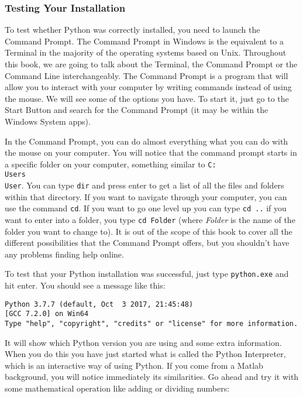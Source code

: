 \subsubsection{Testing Your Installation}
To test whether Python was correctly installed, you need to launch the Command Prompt. The Command Prompt in Windows is the equivalent to a Terminal in the majority of the operating systems based on Unix. Throughout this book, we are going to talk about the Terminal, the Command Prompt or the Command Line interchangeably. The Command Prompt is a program that will allow you to interact with your computer by writing commands instead of using the mouse. We will see some of the options you have. To start it, just go to the Start Button and search for the Command Prompt (it may be within the Windows System apps). 

In the Command Prompt, you can do almost everything what you can do with the mouse on your computer. You will notice that the command prompt starts in a specific folder on your computer, something similar to \texttt{C:\\Users\\User}. You can type \texttt{dir} and press enter to get a list of all the files and folders within that directory. If you want to navigate through your computer, you can use the command \texttt{cd}. If you want to go one level up you can type \texttt{cd ..} if you want to enter into a folder, you type \texttt{cd Folder} (where \textit{Folder} is the name of the folder you want to change to). It is out of the scope of this book to cover all the different possibilities that the Command Prompt offers, but you shouldn't have any problems finding help online.

To test that your Python installation was successful, just type \texttt{python.exe} and hit enter. You should see a message like this:

\begin{verbatim}
Python 3.7.7 (default, Oct  3 2017, 21:45:48)
[GCC 7.2.0] on Win64
Type "help", "copyright", "credits" or "license" for more information.
\end{verbatim}

It will show which Python version you are using and some extra information. When you do this you have just started what is called the Python Interpreter, which is an interactive way of using Python. If you come from a Matlab background, you will notice immediately its similarities. Go ahead and try it with some mathematical operation like adding or dividing numbers:

